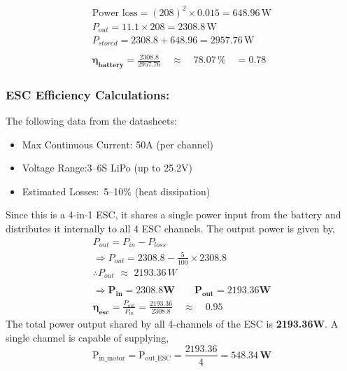 \documentclass[12pt]{report}
\begin{document}
    \begin{gather*}
      \text{Power loss} = (208)^2 \times 0.015 = 648.96 \, \text{W} \\
      P_{out} = 11.1 \times 208 = 2308.8 \, \text{W} \\
      P_{stored} = 2308.8 + 648.96 = 2957.76 \, \text{W} \\ \\
      \boldsymbol{\eta_{battery}} = \frac{2308.8}{2957.76} \quad \approx \quad 78.07\, \% \quad = \boldsymbol{0.78}
    \end{gather*}
      \subsubsection{\large ESC Efficiency Calculations:}
      The following data from the datasheets:
      \begin{itemize}
        \item Max Continuous Current:	\hfill50A (per channel)
        \item Voltage Range:\hfill	3–6S LiPo (up to 25.2V)
        \item Estimated Losses:\hfill	~5–10\% (heat dissipation)
      \end{itemize}
      Since this is a 4-in-1 ESC, it shares a single power input from the battery and distributes it internally to all 4 ESC channels. The output power is given by,
      \begin{gather*} 
        P_{out} = P_{in} - P_{loss}\\
        \Rightarrow P_{out} = 2308.8 - \frac{5}{100} \times 2308.8 \\
        \therefore P_{out} \,\, \approx \,\, 2193.36 \, W \\ \\
        \Rightarrow \boldsymbol{P_{in} = 2308.8W} \quad \quad \boldsymbol{P_{out} = 2193.36W} \\ 
        \boldsymbol{\eta_{esc}} = \frac{P_{out}}{P_{in}} = \frac{2193.36}{2308.8} \quad \approx \quad \boldsymbol{0.95}
      \end{gather*}
      The total power output shared by all 4-channels of the ESC is \textbf{2193.36W}. A single channel is capable of supplying, \[ \mathrm{P_{in\_motor}} = \mathrm{P_{out\_ESC}} = \frac{2193.36}{4} = \boldsymbol{548.34 \, \text{W}} \]
  
\end{document}
